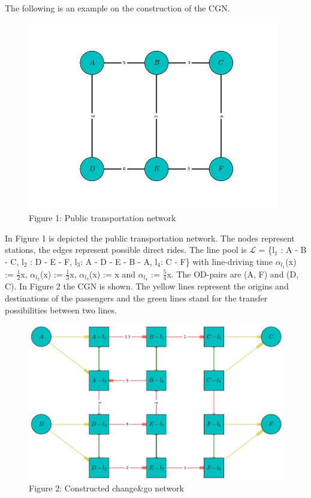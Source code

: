 \documentclass[
  twoside,
  11pt, a4paper,
  footinclude=true,
  headinclude=true,
  cleardoublepage=empty
]{book}
\theoremstyle{definition}
\begin{document}
The following is an example on the construction of the CGN.\newline
\begin{figure}[htbp]
\centering
\includegraphics[width=11cm]{esempio1.jpeg}%
\caption*{Figure 1: Public transportation network}
\end{figure}
In Figure 1 is depicted the public transportation network. The nodes represent stations, the edges represent possible direct rides.\newline
The line pool is $\mathcal{L}$ = \{l$_1$ : A - B - C, l$_2$ : D - E - F, l$_3$: A - D - E - B - A, l$_4$: C - F\} with line-driving time $\alpha_{l_1}$(x) := $\frac{1}{2}$x, $\alpha_{l_2}$(x) := $\frac{1}{3}$x, $\alpha_{l_3}$(x) := x and $\alpha_{l_4}$ := $\frac{5}{4}$x. The OD-pairs are (A, F) and (D, C). \newline
In Figure 2 the CGN is shown. The yellow lines represent the origins and destinations of the passengers and the green lines stand for the transfer possibilities between two lines.
\begin{figure}[htbp]
\centering
\includegraphics[width=12cm]{figura1.jpg}%
\caption*{Figure 2: Constructed change\&go network}
\end{figure}
\end{document}
